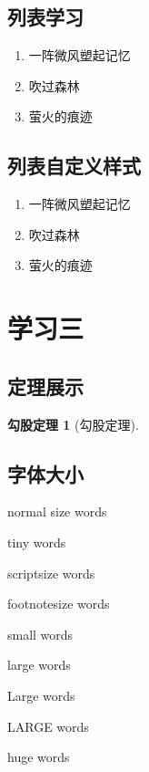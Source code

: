 \documentclass[12pt, a4paper, oneside]{ctexart}
\newtheorem{theorem}{勾股定理}[section]
\begin{document}
\subsection{列表学习}
\begin{enumerate}
    \item 一阵微风塑起记忆
    \item 吹过森林
    \item 萤火的痕迹
\end{enumerate}

\subsection{列表自定义样式}
\begin{enumerate}
    \item[(1)] 一阵微风塑起记忆
    \item[(2)] 吹过森林
    \item[(3)] 萤火的痕迹
\end{enumerate}

\section{学习三}

\subsection{定理展示}
\begin{theorem}[勾股定理]
\end{theorem}

\subsection{字体大小}
normal size words

{\tiny tiny words}

{\scriptsize scriptsize words}

{\footnotesize footnotesize words}

{\small small words}

{\large large words}

{\Large Large words} 

{\LARGE LARGE words}

{\huge huge words}
\end{document}
